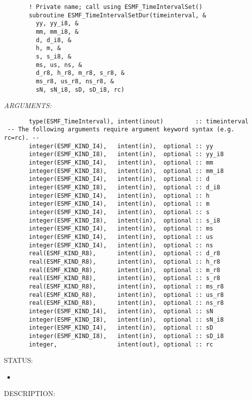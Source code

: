  
\begin{verbatim}       ! Private name; call using ESMF_TimeIntervalSet()
       subroutine ESMF_TimeIntervalSetDur(timeinterval, &
         yy, yy_i8, &
         mm, mm_i8, &
         d, d_i8, &
         h, m, &
         s, s_i8, &
         ms, us, ns, &
         d_r8, h_r8, m_r8, s_r8, &
         ms_r8, us_r8, ns_r8, &
         sN, sN_i8, sD, sD_i8, rc)
 \end{verbatim}{\em ARGUMENTS:}
\begin{verbatim}       type(ESMF_TimeInterval), intent(inout)         :: timeinterval
 -- The following arguments require argument keyword syntax (e.g. rc=rc). --
       integer(ESMF_KIND_I4),   intent(in),  optional :: yy
       integer(ESMF_KIND_I8),   intent(in),  optional :: yy_i8
       integer(ESMF_KIND_I4),   intent(in),  optional :: mm
       integer(ESMF_KIND_I8),   intent(in),  optional :: mm_i8
       integer(ESMF_KIND_I4),   intent(in),  optional :: d
       integer(ESMF_KIND_I8),   intent(in),  optional :: d_i8
       integer(ESMF_KIND_I4),   intent(in),  optional :: h
       integer(ESMF_KIND_I4),   intent(in),  optional :: m
       integer(ESMF_KIND_I4),   intent(in),  optional :: s
       integer(ESMF_KIND_I8),   intent(in),  optional :: s_i8
       integer(ESMF_KIND_I4),   intent(in),  optional :: ms
       integer(ESMF_KIND_I4),   intent(in),  optional :: us
       integer(ESMF_KIND_I4),   intent(in),  optional :: ns
       real(ESMF_KIND_R8),      intent(in),  optional :: d_r8
       real(ESMF_KIND_R8),      intent(in),  optional :: h_r8
       real(ESMF_KIND_R8),      intent(in),  optional :: m_r8
       real(ESMF_KIND_R8),      intent(in),  optional :: s_r8
       real(ESMF_KIND_R8),      intent(in),  optional :: ms_r8
       real(ESMF_KIND_R8),      intent(in),  optional :: us_r8
       real(ESMF_KIND_R8),      intent(in),  optional :: ns_r8
       integer(ESMF_KIND_I4),   intent(in),  optional :: sN
       integer(ESMF_KIND_I8),   intent(in),  optional :: sN_i8
       integer(ESMF_KIND_I4),   intent(in),  optional :: sD
       integer(ESMF_KIND_I8),   intent(in),  optional :: sD_i8
       integer,                 intent(out), optional :: rc
 \end{verbatim}
{\sf STATUS:}
   \begin{itemize}
   \item{}
   \end{itemize}
  
{\sf DESCRIPTION:\\ }


